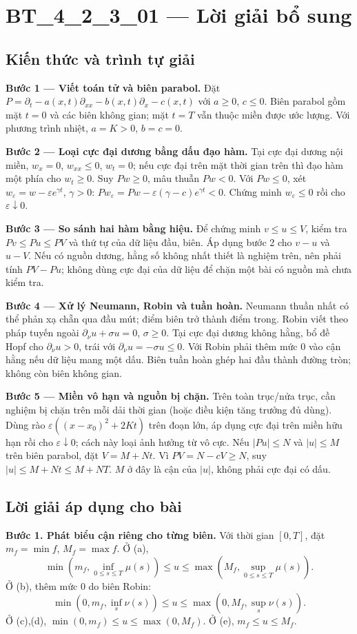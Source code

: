 \documentclass[10pt,a4paper]{article}
\begin{document}
\section*{BT\_4\_2\_3\_01 — Lời giải bổ sung}
\subsection*{Kiến thức và trình tự giải}
\textbf{Bước 1 — Viết toán tử và biên parabol.} Đặt $P=\partial_t-a(x,t)\partial_{xx}-b(x,t)\partial_x-c(x,t)$ với $a\ge0$, $c\le0$. Biên parabol gồm mặt $t=0$ và các biên không gian; mặt $t=T$ vẫn thuộc miền được ước lượng. Với phương trình nhiệt, $a=K>0$, $b=c=0$.

\textbf{Bước 2 — Loại cực đại dương bằng dấu đạo hàm.} Tại cực đại dương nội miền, $w_x=0$, $w_{xx}\le0$, $w_t=0$; nếu cực đại trên mặt thời gian trên thì đạo hàm một phía cho $w_t\ge0$. Suy $Pw\ge0$, mâu thuẫn $Pw<0$. Với $Pw\le0$, xét $w_\varepsilon=w-\varepsilon e^{\gamma t}$, $\gamma>0$: $Pw_\varepsilon=Pw-\varepsilon(\gamma-c)e^{\gamma t}<0$. Chứng minh $w_\varepsilon\le0$ rồi cho $\varepsilon\downarrow0$.

\textbf{Bước 3 — So sánh hai hàm bằng hiệu.} Để chứng minh $v\le u\le V$, kiểm tra $Pv\le Pu\le PV$ và thứ tự của dữ liệu đầu, biên. Áp dụng bước 2 cho $v-u$ và $u-V$. Nếu có nguồn dương, hằng số không nhất thiết là nghiệm trên, nên phải tính $PV-Pu$; không dùng cực đại của dữ liệu để chặn một bài có nguồn mà chưa kiểm tra.

\textbf{Bước 4 — Xử lý Neumann, Robin và tuần hoàn.} Neumann thuần nhất có thể phản xạ chẵn qua đầu mút; điểm biên trở thành điểm trong. Robin viết theo pháp tuyến ngoài $\partial_\nu u+\sigma u=0$, $\sigma\ge0$. Tại cực đại dương không hằng, bổ đề Hopf cho $\partial_\nu u>0$, trái với $\partial_\nu u=-\sigma u\le0$. Với Robin phải thêm mức $0$ vào cận hằng nếu dữ liệu mang một dấu. Biên tuần hoàn ghép hai đầu thành đường tròn; không còn biên không gian.

\textbf{Bước 5 — Miền vô hạn và nguồn bị chặn.} Trên toàn trục/nửa trục, cần nghiệm bị chặn trên mỗi dải thời gian (hoặc điều kiện tăng trưởng đủ dùng). Dùng rào $\varepsilon((x-x_0)^2+2Kt)$ trên đoạn lớn, áp dụng cực đại trên miền hữu hạn rồi cho $\varepsilon\downarrow0$; cách này loại ảnh hưởng từ vô cực. Nếu $|Pu|\le N$ và $|u|\le M$ trên biên parabol, đặt $V=M+Nt$. Vì $PV=N-cV\ge N$, suy $|u|\le M+Nt\le M+NT$. $M$ ở đây là cận của $|u|$, không phải cực đại có dấu.
\subsection*{Lời giải áp dụng cho bài}
\textbf{Bước 1. Phát biểu cận riêng cho từng biên.} Với thời gian $[0,T]$, đặt $m_f=\min f$, $M_f=\max f$. Ở (a),
\[\min(m_f,\inf_{0\le s\le T}\mu(s))\le u\le
\max(M_f,\sup_{0\le s\le T}\mu(s)).\]
Ở (b), thêm mức $0$ do biên Robin:
\[\min(0,m_f,\inf_s\nu(s))\le u\le\max(0,M_f,\sup_s\nu(s)).\]
Ở (c),(d), $\min(0,m_f)\le u\le\max(0,M_f)$. Ở (e), $m_f\le u\le M_f$.
\end{document}
